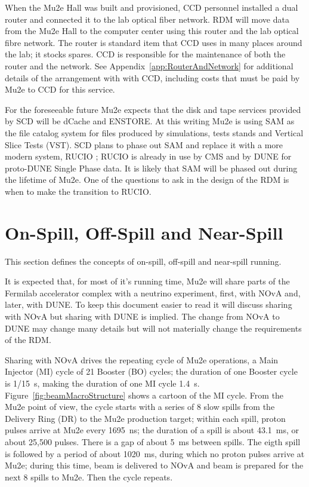 When the Mu2e Hall was built and provisioned, CCD personnel installed a dual router
and connected it to the lab optical fiber network.
RDM will move data from the Mu2e Hall
to the computer center using this router and the lab optical fibre network.
The router is standard item that CCD uses in many places around the lab; it stocks spares.
CCD is responsible for the maintenance of both the router and the network.
See Appendix~\ref{app:RouterAndNetwork} for additional details of the arrangement with with CCD,
including costs that must be paid by Mu2e to CCD for this service.


For the foreseeable future Mu2e expects that the disk and tape services provided
by SCD will be dCache and ENSTORE.
At this writing Mu2e is using SAM as the file catalog system for files produced
by simulations, tests stands and Vertical Slice Tests (VST).
SCD plans to phase out SAM and replace it with a more modern system, RUCIO ;
RUCIO is already in use by CMS and by DUNE for proto-DUNE Single Phase data.
It is likely that SAM will be phased out during the lifetime of Mu2e.
One of the questions to ask in the design of the RDM is
when to make the transition to RUCIO.

\section{On-Spill, Off-Spill and Near-Spill}

This section defines the concepts of on-spill, off-spill and near-spill running.

It is expected that, for most of it's running time,
Mu2e will share parts of the Fermilab accelerator complex with a neutrino experiment,
first, with NOvA and, later, with DUNE.
To keep this document easier to read it will discuss sharing with NOvA but sharing with DUNE is implied.
The change from NOvA to DUNE may change many details
but will not materially change the requirements of the RDM.

Sharing with NOvA drives the repeating cycle of Mu2e operations, a Main Injector (MI) cycle of
21 Booster (BO) cycles;
the duration of one Booster cycle is 1/15~s,
making the duration of one MI cycle 1.4~s.
Figure~\ref{fig:beamMacroStructure} shows a cartoon of the MI cycle.
From the Mu2e point of view, the cycle starts with a series of 8 slow spills
from the Delivery Ring (DR) to the Mu2e production target;
within each spill, proton pulses arrive at Mu2e every 1695~ns;
the duration of a spill is about 43.1~ms, or about 25,500 pulses.
There is a gap of about 5~ms between spills.
The eigth spill is followed by a period of about 1020~ms,
during which no proton pulses arrive at Mu2e;
during this time, beam is delivered to NOvA
and beam is prepared for the next 8 spills to Mu2e.
Then the cycle repeats.

